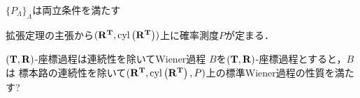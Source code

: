 	\begin{itembox}[l]{$\{P_\Lambda\}_\Lambda$は両立条件を満たす}
	\end{itembox}
	
	\begin{sketch}
		
	\end{sketch}
	
	拡張定理の主張から$(\mathbf{R}^{\mathbf{T}},\operatorname{cyl}\left(\mathbf{R}^{\mathbf{T}}\right))$上に確率測度$P$が定まる．
	
	\begin{itembox}[l]{$(\mathbf{T},\mathbf{R})$-座標過程は連続性を除いてWiener過程}
		$B$を$(\mathbf{T},\mathbf{R})$-座標過程とすると，$B$は
		標本路の連続性を除いて$(\mathbf{R}^{\mathbf{T}},\operatorname{cyl}\left(\mathbf{R}^{\mathbf{T}}\right),P)$上の標準Wiener過程の性質を満たす?
	\end{itembox}